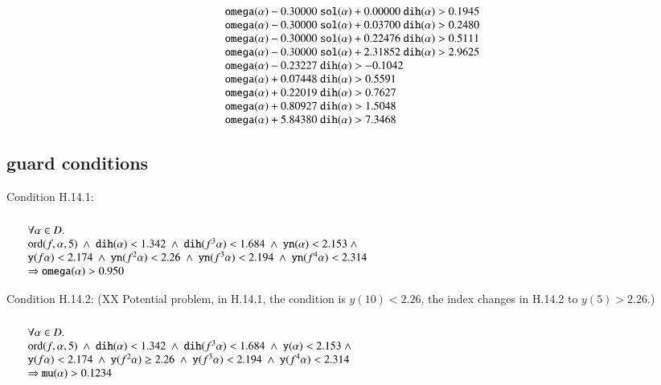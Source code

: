 $$\begin{array}{lll}
   \optt{omega}(\alpha) - 0.30000\ \optt{sol}(\alpha) + 0.00000\ \optt{dih}(\alpha) > 0.1945\\
   \optt{omega}(\alpha) - 0.30000\ \optt{sol}(\alpha) + 0.03700\ \optt{dih}(\alpha) > 0.2480\\
   \optt{omega}(\alpha) - 0.30000\ \optt{sol}(\alpha) + 0.22476\ \optt{dih}(\alpha) > 0.5111\\
   \optt{omega}(\alpha) - 0.30000\ \optt{sol}(\alpha) + 2.31852\ \optt{dih}(\alpha) > 2.9625\\
   \optt{omega}(\alpha) - 0.23227\ \optt{dih}(\alpha) > -0.1042\\
   \optt{omega}(\alpha) + 0.07448\ \optt{dih}(\alpha) > 0.5591\\
   \optt{omega}(\alpha) + 0.22019\ \optt{dih}(\alpha) > 0.7627\\
   \optt{omega}(\alpha) + 0.80927\ \optt{dih}(\alpha) > 1.5048\\
   \optt{omega}(\alpha) + 5.84380\ \optt{dih}(\alpha) > 7.3468\\
\end{array}
$$




\subsection{guard conditions}

\noindent
Condition H.14.1:  %
$$
\begin{array}{lll}
\leftalign\\
\forall \alpha\in D.\\
  \op{ord}(f,\alpha,5) \sland 
  \optt{dih}(\alpha) < 1.342 \sland
  \optt{dih}(f^3\alpha) < 1.684 \sland
  \optt{yn}(\alpha) < 2.153 \sland \\
   \optt{y}(f\alpha) < 2.174 \sland
  \optt{yn}(f^2\alpha) < 2.26 \sland
  \optt{yn}(f^3 \alpha) < 2.194 \sland
  \optt{yn}(f^4 \alpha) < 2.314  \\
  \Rightarrow
  \optt{omega}(\alpha) > 0.950
\end{array}
$$

\noindent
Condition H.14.2:  (XX Potential problem, in H.14.1, the
condition is $y(10)< 2.26$, the index changes in H.14.2
to $y(5) > 2.26$.)
$$
\begin{array}{lll}
\leftalign\\
\forall \alpha\in D.\\
  \op{ord}(f,\alpha,5) \sland 
  \optt{dih}(\alpha) < 1.342 \sland
  \optt{dih}(f^3\alpha) < 1.684 \sland
  \optt{y}(\alpha) < 2.153 \sland \\
   \optt{y}(f\alpha) < 2.174 \sland
  \optt{y}(f^2\alpha) \ge 2.26 \sland
  \optt{y}(f^3 \alpha) < 2.194 \sland
  \optt{y}(f^4 \alpha) < 2.314  \\
   \Rightarrow
  \optt{mu}(\alpha) > 0.1234
\end{array}
$$
